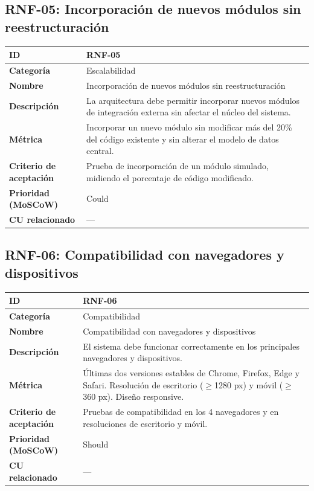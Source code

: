 \documentclass[12pt, a4paper]{article}
\begin{document}
\subsection{RNF-05: Incorporación de nuevos módulos sin reestructuración}
\begin{center}
\renewcommand{\arraystretch}{1.4}
\begin{tabular}{|L{4cm}|L{12cm}|}
\hline
\textbf{ID} & RNF-05 \\
\hline
\textbf{Categoría} & Escalabilidad \\
\hline
\textbf{Nombre} & Incorporación de nuevos módulos sin reestructuración \\
\hline
\textbf{Descripción} & La arquitectura debe permitir incorporar nuevos módulos de integración externa sin afectar el núcleo del sistema. \\
\hline
\textbf{Métrica} & Incorporar un nuevo módulo sin modificar más del 20\% del código existente y sin alterar el modelo de datos central. \\
\hline
\textbf{Criterio de aceptación} & Prueba de incorporación de un módulo simulado, midiendo el porcentaje de código modificado. \\
\hline
\textbf{Prioridad (MoSCoW)} & Could \\
\hline
\textbf{CU relacionado} & --- \\
\hline
\end{tabular}
\end{center}

\subsection{RNF-06: Compatibilidad con navegadores y dispositivos}
\begin{center}
\renewcommand{\arraystretch}{1.4}
\begin{tabular}{|L{4cm}|L{12cm}|}
\hline
\textbf{ID} & RNF-06 \\
\hline
\textbf{Categoría} & Compatibilidad \\
\hline
\textbf{Nombre} & Compatibilidad con navegadores y dispositivos \\
\hline
\textbf{Descripción} & El sistema debe funcionar correctamente en los principales navegadores y dispositivos. \\
\hline
\textbf{Métrica} & Últimas dos versiones estables de Chrome, Firefox, Edge y Safari. Resolución de escritorio ($\geq$1280 px) y móvil ($\geq$360 px). Diseño responsive. \\
\hline
\textbf{Criterio de aceptación} & Pruebas de compatibilidad en los 4 navegadores y en resoluciones de escritorio y móvil. \\
\hline
\textbf{Prioridad (MoSCoW)} & Should \\
\hline
\textbf{CU relacionado} & --- \\
\hline
\end{tabular}
\end{center}
\end{document}
